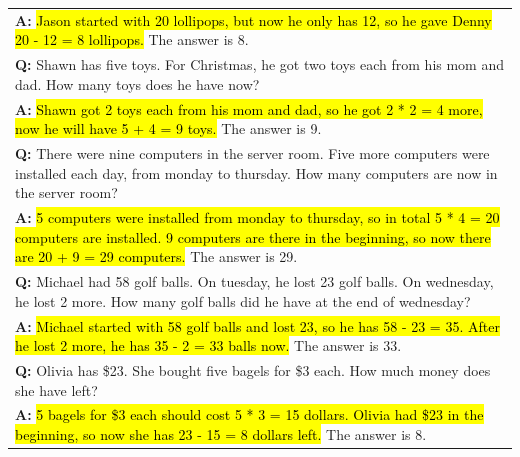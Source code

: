\documentclass[]{article}
\theoremstyle{plain}
\theoremstyle{definition}
\theoremstyle{remark}
\begin{document}
\begin{table}[H]
\begin{tabular}{p{\linewidth}}
        \vspace{-1mm}
        \textbf{A:} \hl{Jason started with 20 lollipops, but now he only has 12, so he gave Denny 20 - 12 = 8 lollipops.} The answer is 8. \\
        \vspace{0mm}
        \textbf{Q:} Shawn has five toys. For Christmas, he got two toys each from his mom and dad. How many toys does he have now? \\
        \vspace{-1mm}
        \textbf{A:} \hl{Shawn got 2 toys each from his mom and dad, so he got 2 * 2 = 4 more, now he will have 5 + 4 = 9 toys.} The answer is 9. \\
        \vspace{0mm}
        \textbf{Q:} There were nine computers in the server room. Five more computers were installed each day, from monday to thursday. How many computers are now in the server room? \\
        \vspace{-1mm}
        \textbf{A:} \hl{5 computers were installed from monday to thursday, so in total 5 * 4 = 20 computers are installed. 9 computers are there in the beginning, so now there are 20 + 9 = 29 computers.} The answer is 29. \\
        \vspace{0mm}
        \textbf{Q:} Michael had 58 golf balls. On tuesday, he lost 23 golf balls. On wednesday, he lost 2 more. How many golf balls did he have at the end of wednesday? \\
        \vspace{-1mm}
        \textbf{A:} \hl{Michael started with 58 golf balls and lost 23, so he has 58 - 23 = 35. After he lost 2 more, he has 35 - 2 = 33 balls now.} The answer is 33. \\
        \vspace{0mm}
        \textbf{Q:} Olivia has \$23. She bought five bagels for \$3 each. How much money does she have left? \\
        \vspace{-1mm}
        \textbf{A:} \hl{5 bagels for \$3 each should cost 5 * 3 = 15 dollars. Olivia had \$23 in the beginning, so now she has 23 - 15 = 8 dollars left.} The answer is 8. \\
        \bottomrule
    \end{tabular}
    \label{tab:appendix-mwp-prompts-alt}
\end{table}
\endgroup
\end{document}
